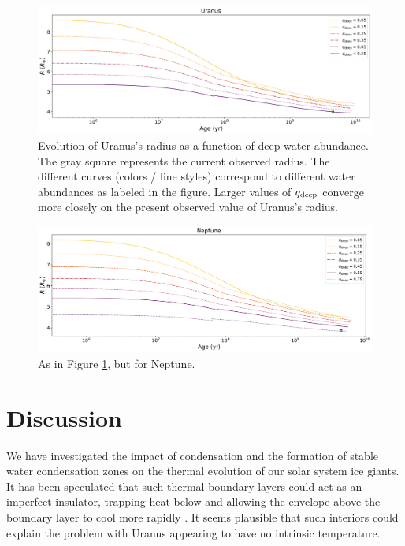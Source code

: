 \documentclass[11pt]{ucscthesisbs}
\begin{document}
\begin{figure}[h]
 \centerline{
  \includegraphics[width=\columnwidth]{figures/u_cooling_radius_nz_4096_logx_more_qdeeps.png}
 }
\caption[Thermal Evolution Curves for Uranus - Radius]
{Evolution of Uranus's radius as a function of deep water abundance. The gray square represents the current observed radius. The different curves (colors / line styles) correspond to different water abundances as labeled in the figure. Larger values of $q_{\rm deep}$ converge more closely on the present observed value of Uranus's radius. }
\label{fig:evolve_uranus_radius}
\end{figure}

 
\begin{figure}[h]
 \centerline{
  \includegraphics[width=\columnwidth]{figures/n_cooling_radius_nz_4096_logx.png}
 }
\caption[Thermal Evolution Curves for Neptune - Radius]
{As in Figure \ref{fig:evolve_uranus_radius}, but for Neptune.}
\label{fig:evolve_neptune_radius}
\end{figure}



\chapter{Discussion}
We have investigated the impact of condensation and the formation of stable water condensation zones on the thermal evolution of our solar system ice giants. It has been speculated that such thermal boundary layers could act as an imperfect insulator, trapping heat below and allowing the envelope above the boundary layer to cool more rapidly \citep{nettelmann_2016,friedson_2017,leconte_2017,podolak_1991,2019A&A...632A..70S}. It seems plausible that such interiors could explain the problem with Uranus appearing to have no intrinsic temperature. 
\end{document}
